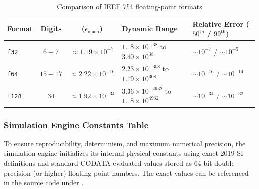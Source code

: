 \begin{table}
\centering
\small
\caption{Comparison of IEEE 754 floating-point formats\cite{IEEE754_2019}}
\label{tab:floating_point_comparison}
\begin{tabularx}{\textwidth}{l c c X X}
\toprule
\textbf{Format} & \textbf{Digits} & \textbf{($\epsilon_{\text{mach}}$)} & \textbf{Dynamic Range} & \textbf{Relative Error ($50^{\text{th}}$ / $99^{\text{th}}$)} \\
\midrule
\texttt{f32}  & $6-7$   & $\approx 1.19 \times 10^{-7}$  & $1.18 \times 10^{-38}$   to $3.40 \times 10^{38}$   & $\sim 10^{-7}$  / $\sim 10^{-5}$  \\
\texttt{f64}  & $15-17$ & $\approx 2.22 \times 10^{-16}$ & $2.23 \times 10^{-308}$  to $1.79 \times 10^{308}$  & $\sim 10^{-16}$ / $\sim 10^{-14}$ \\
\texttt{f128} & $34$    & $\approx 1.92 \times 10^{-34}$ & $3.36 \times 10^{-4932}$ to $1.18 \times 10^{4932}$ & $\sim 10^{-34}$ / $\sim 10^{-32}$ \\
\bottomrule
\end{tabularx}
\end{table}


\subsubsection{Simulation Engine Constants Table}

To ensure reproducibility, determinism, and maximum numerical precision, 
the simulation engine initializes its internal physical constants using exact 2019 SI definitions\cite{Newell2019NIST330, BIPM2019SIBrochure} 
and standard CODATA evaluated values\cite{Mohr2016CODATA} stored as 64-bit double-precision (or higher) floating-point numbers.
The exact values can be referenced in the source code under .
